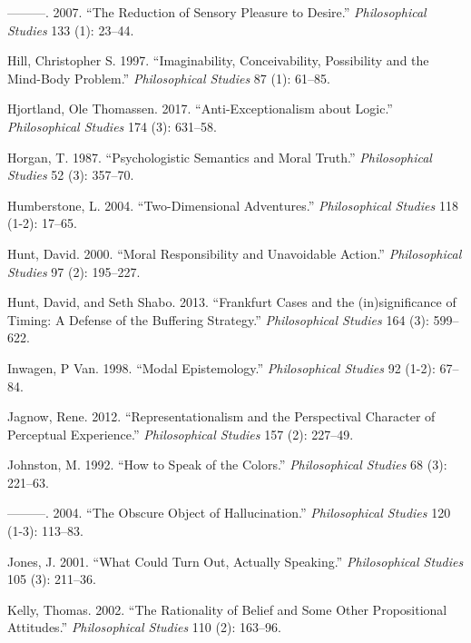 \documentclass[
  10pt,
  letterpaper,
  DIV=11,
  numbers=noendperiod,
  twoside]{scrartcl}
\newlength{\cslhangindent}
\newenvironment{CSLReferences}[2] %
 {\begin{list}{}{%
  \setlength{\itemindent}{0pt}
  \setlength{\leftmargin}{0pt}
  \setlength{\parsep}{0pt}
  \ifodd #1
   \setlength{\leftmargin}{\cslhangindent}
   \setlength{\itemindent}{-1\cslhangindent}
  \fi
  \setlength{\itemsep}{#2\baselineskip}}}
 {\end{list}}
\begin{document}
\begin{CSLReferences}{1}{0}
---------. 2007. {``The Reduction of Sensory Pleasure to Desire.''}
\emph{Philosophical Studies} 133 (1): 23--44.

Hill, Christopher S. 1997. {``Imaginability, Conceivability, Possibility
and the Mind-Body Problem.''} \emph{Philosophical Studies} 87 (1):
61--85.

Hjortland, Ole Thomassen. 2017. {``Anti-Exceptionalism about Logic.''}
\emph{Philosophical Studies} 174 (3): 631--58.

Horgan, T. 1987. {``Psychologistic Semantics and Moral Truth.''}
\emph{Philosophical Studies} 52 (3): 357--70.

Humberstone, L. 2004. {``Two-Dimensional Adventures.''}
\emph{Philosophical Studies} 118 (1-2): 17--65.

Hunt, David. 2000. {``Moral Responsibility and Unavoidable Action.''}
\emph{Philosophical Studies} 97 (2): 195--227.

Hunt, David, and Seth Shabo. 2013. {``Frankfurt Cases and the
(in)significance of Timing: A Defense of the Buffering Strategy.''}
\emph{Philosophical Studies} 164 (3): 599--622.

Inwagen, P Van. 1998. {``Modal Epistemology.''} \emph{Philosophical
Studies} 92 (1-2): 67--84.

Jagnow, Rene. 2012. {``Representationalism and the Perspectival
Character of Perceptual Experience.''} \emph{Philosophical Studies} 157
(2): 227--49.

Johnston, M. 1992. {``How to Speak of the Colors.''} \emph{Philosophical
Studies} 68 (3): 221--63.

---------. 2004. {``The Obscure Object of Hallucination.''}
\emph{Philosophical Studies} 120 (1-3): 113--83.

Jones, J. 2001. {``What Could Turn Out, Actually Speaking.''}
\emph{Philosophical Studies} 105 (3): 211--36.

Kelly, Thomas. 2002. {``The Rationality of Belief and Some Other
Propositional Attitudes.''} \emph{Philosophical Studies} 110 (2):
163--96.


\end{CSLReferences}
\end{document}

